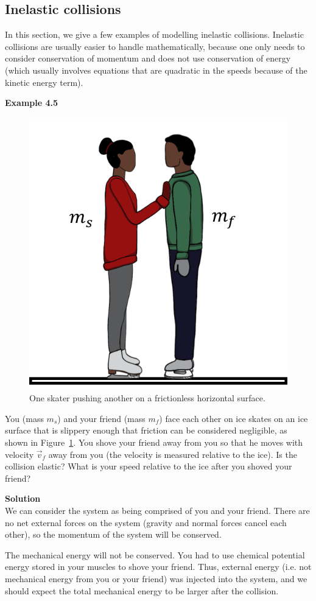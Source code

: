 \documentclass[9pt,arxiv,red]{lapreprint}
\begin{document}
\subsection{Inelastic collisions}

In this section, we give a few examples of modelling inelastic collisions. Inelastic collisions are usually easier to handle mathematically, because one only needs to consider conservation of momentum and does not use conservation of energy (which usually involves equations that are quadratic in the speeds because of the kinetic energy term).

\begin{framed}
\textbf{Example 4.5}\\
\begin{figure}[!htbp]
\centering
\includegraphics[width=0.4\linewidth]{files/skaters-3e4f05ca0612b57a349cdcab710b732c.png}
\caption[]{One skater pushing another on a frictionless horizontal surface.}
\label{fig:momentumandcm:skaters}
\end{figure}

You (mass $m_s$) and your friend (mass $m_f$) face each other on ice skates on an ice surface that is slippery enough that friction can be considered negligible, as shown in Figure~\ref{fig:momentumandcm:skaters}. You shove your friend away from you so that he moves with velocity $\vec v_f$ away from you (the velocity is measured relative to the ice). Is the collision elastic? What is your speed relative to the ice after you shoved your friend?

\begin{framed}
\textbf{Solution}\\
We can consider the system as being comprised of you and your friend. There are no net external forces on the system (gravity and normal forces cancel each other), so the momentum of the system will be conserved.

The mechanical energy will not be conserved. You had to use chemical potential energy stored in your muscles to shove your friend. Thus, external energy (i.e. not mechanical energy from you or your friend) was injected into the system, and we should expect the total mechanical energy to be larger after the collision.


\end{framed}
\end{framed}
\end{document}
